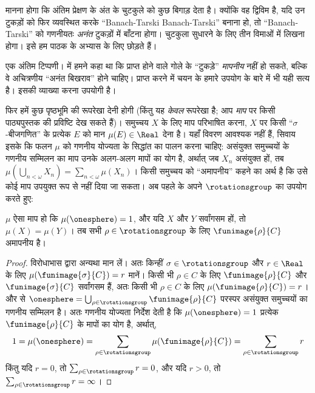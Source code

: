 \documentclass[../../../include/open-logic-section]{subfiles}
\begin{document}
मानना होगा कि अंतिम प्रेक्षण  के अंत के चुटकुले को कुछ
बिगाड़ देता है। क्योंकि वह द्विविम है, यदि उन टुकड़ों को फिर व्यवस्थित करके
``Banach-Tarski Banach-Tarski'' बनाना हो, तो ``Banach-Tarski'' को गणनीयतः
\emph{अनंत} टुकड़ों में बाँटना होगा। चुटकुला सुधारने के लिए तीन विमाओं में
लिखना होगा। इसे हम पाठक के अभ्यास के लिए छोड़ते हैं।

एक अंतिम टिप्पणी।  में हमने कहा था कि प्राप्त होने वाले
गोले के ``टुकड़े'' \emph{मापनीय} नहीं हो सकते, बल्कि वे अचित्रणीय ``अनंत
बिखराव'' होने चाहिए।  प्राप्त करने में चयन के
हमारे उपयोग के बारे में भी यही सत्य है। इसकी व्याख्या करना उपयोगी है।

फिर हमें कुछ पृष्ठभूमि की रूपरेखा देनी होगी (किंतु यह \emph{केवल} रूपरेखा
है; आप \emph{माप} पर किसी पाठ्यपुस्तक की प्रविष्टि देख सकते हैं)। समुच्चय
$X$ के लिए माप परिभाषित करना, $X$ पर किसी ``$\sigma$-बीजगणित'' के प्रत्येक
$E$ को मान $\mu(E)\in\Real$ देना है। यहाँ विवरण आवश्यक नहीं हैं, सिवाय इसके
कि फलन $\mu$ को गणनीय योज्यता के सिद्धांत का पालन करना चाहिए: असंयुक्त
समुच्चयों के गणनीय सम्मिलन का माप उनके अलग-अलग मापों का योग है, अर्थात् जब
$X_n$ असंयुक्त हों, तब
$\mu(\bigcup_{n<\omega}X_n)=\sum_{n<\omega}\mu(X_n)$। किसी समुच्चय को
``अमापनीय'' कहने का अर्थ है कि उसे कोई माप उपयुक्त रूप से नहीं दिया जा
सकता। अब पहले के अपने $\rotationsgroup$ का उपयोग करते हुए:

\begin{cor}[Vitali]
$\mu$ ऐसा माप हो कि $\mu(\onesphere)=1$, और यदि $X$ और $Y$ सर्वांगसम हों,
तो $\mu(X)=\mu(Y)$। तब सभी $\rho\in\rotationsgroup$ के लिए
$\funimage{\rho}{C}$ अमापनीय है।
\end{cor}

\begin{proof}
विरोधाभास द्वारा अन्यथा मान लें। अतः किन्हीं
$\sigma\in\rotationsgroup$ और $r\in\Real$ के लिए
$\mu(\funimage{\sigma}{C})=r$ मानें। किसी भी $\rho\in C$ के लिए
$\funimage{\rho}{C}$ और $\funimage{\sigma}{C}$ सर्वांगसम हैं, अतः किसी भी
$\rho\in C$ के लिए $\mu(\funimage{\rho}{C})=r$।  और
 से
$\onesphere=\bigcup_{\rho\in\rotationsgroup}\funimage{\rho}{C}$ परस्पर
असंयुक्त समुच्चयों का गणनीय सम्मिलन है। अतः गणनीय योज्यता निर्देश देती है
कि $\mu(\onesphere)=1$ प्रत्येक $\funimage{\rho}{C}$ के मापों का योग है,
अर्थात्,
\[
	1 = \mu(\onesphere) = \sum_{\rho \in \rotationsgroup}\mu(\funimage{\rho}{C}) = \sum_{\rho \in \rotationsgroup}r
\]
किंतु यदि $r=0$, तो $\sum_{\rho\in\rotationsgroup}r=0$, और यदि $r>0$, तो
$\sum_{\rho\in\rotationsgroup}r=\infty$।
\end{proof}
\end{document}
